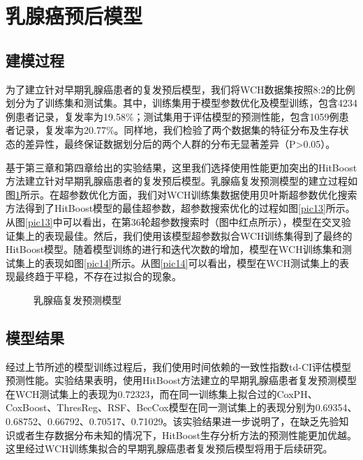 \section{乳腺癌预后模型}

\subsection{建模过程}
为了建立针对早期乳腺癌患者的复发预后模型，我们将WCH数据集按照8:2的比例划分为了训练集和测试集。其中，训练集用于模型参数优化及模型训练，包含4234例患者记录，复发率为19.58\%；测试集用于评估模型的预测性能，包含1059例患者记录，复发率为20.77\%。同样地，我们检验了两个数据集的特征分布及生存状态的差异性，最终保证数据划分后的两个人群的分布无显著差异（P>0.05）。

基于第三章和第四章给出的实验结果，这里我们选择使用性能更加突出的HitBoost方法建立针对早期乳腺癌患者的复发预后模型。乳腺癌复发预测模型的建立过程如图\ref{pic1314}所示。在超参数优化方面，我们对WCH训练集数据使用贝叶斯超参数优化搜索方法得到了HitBoost模型的最佳超参数，超参数搜索优化的过程如图\ref{pic13}所示。从图\ref{pic13}中可以看出，在第36轮超参数搜索时（图中红点所示），模型在交叉验证集上的表现最佳。然后，我们使用该模型超参数拟合WCH训练集得到了最终的HitBoost模型。随着模型训练的进行和迭代次数的增加，模型在WCH训练集和测试集上的表现如图\ref{pic14}所示。从图\ref{pic14}可以看出，模型在WCH测试集上的表现最终趋于平稳，不存在过拟合的现象。

\begin{figure}[H]
\centering 
{}
\hspace{0.01\linewidth}
\caption{乳腺癌复发预测模型}
\label{pic1314}
\end{figure}

\subsection{模型结果}

经过上节所述的模型训练过程后，我们使用时间依赖的一致性指数td-CI评估模型预测性能。实验结果表明，使用HitBoost方法建立的早期乳腺癌患者复发预测模型在WCH测试集上的表现为0.72323，而在同一训练集上拟合过的CoxPH、CoxBoost、ThresReg、RSF、BecCox模型在同一测试集上的表现分别为0.69354、0.68752、0.66792、0.70517、0.71029。该实验结果进一步说明了，在缺乏先验知识或者生存数据分布未知的情况下，HitBoost生存分析方法的预测性能更加优越。这里经过WCH训练集拟合的早期乳腺癌患者复发预后模型将用于后续研究。

